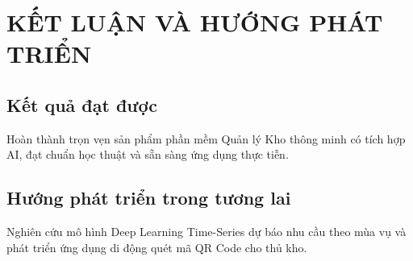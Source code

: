 \chapter{KẾT LUẬN VÀ HƯỚNG PHÁT TRIỂN}
\label{ch:16}

\section{Kết quả đạt được}
Hoàn thành trọn vẹn sản phẩm phần mềm Quản lý Kho thông minh có tích hợp AI, đạt chuẩn học thuật và sẵn sàng ứng dụng thực tiễn.

\section{Hướng phát triển trong tương lai}
Nghiên cứu mô hình Deep Learning Time-Series dự báo nhu cầu theo mùa vụ và phát triển ứng dụng di động quét mã QR Code cho thủ kho.
